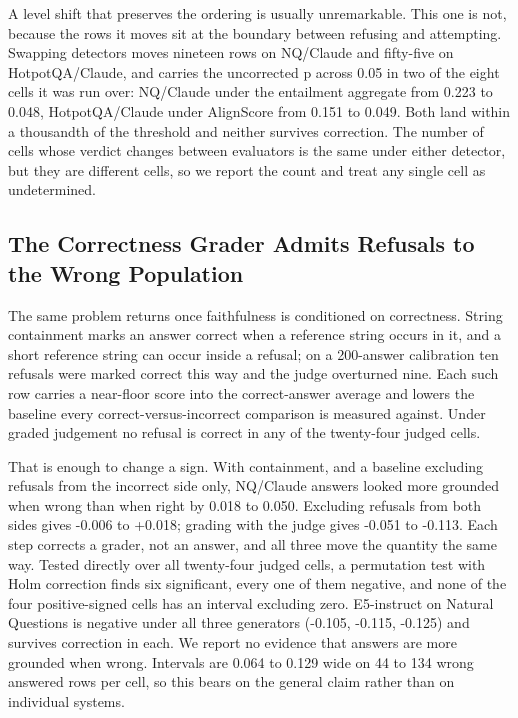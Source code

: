 \documentclass[11pt]{article}
\begin{document}
A level shift that preserves the ordering is usually unremarkable. This one is not, because the rows it moves sit at the boundary between refusing and attempting. Swapping detectors moves nineteen rows on NQ/Claude and fifty-five on HotpotQA/Claude, and carries the uncorrected p across 0.05 in two of the eight cells it was run over: NQ/Claude under the entailment aggregate from 0.223 to 0.048, HotpotQA/Claude under AlignScore from 0.151 to 0.049. Both land within a thousandth of the threshold and neither survives correction. The number of cells whose verdict changes between evaluators is the same under either detector, but they are different cells, so we report the count and treat any single cell as undetermined.


\subsection{The Correctness Grader Admits Refusals to the Wrong Population}
\label{sec:refusals}

The same problem returns once faithfulness is conditioned on correctness. String containment marks an answer correct when a reference string occurs in it, and a short reference string can occur inside a refusal; on a 200-answer calibration ten refusals were marked correct this way and the judge overturned nine. Each such row carries a near-floor score into the correct-answer average and lowers the baseline every correct-versus-incorrect comparison is measured against. Under graded judgement no refusal is correct in any of the twenty-four judged cells.

That is enough to change a sign. With containment, and a baseline excluding refusals from the incorrect side only, NQ/Claude answers looked more grounded when wrong than when right by 0.018 to 0.050. Excluding refusals from both sides gives -0.006 to +0.018; grading with the judge gives -0.051 to -0.113. Each step corrects a grader, not an answer, and all three move the quantity the same way. Tested directly over all twenty-four judged cells, a permutation test with Holm correction finds six significant, every one of them negative, and none of the four positive-signed cells has an interval excluding zero. E5-instruct on Natural Questions is negative under all three generators (-0.105, -0.115, -0.125) and survives correction in each. We report no evidence that answers are more grounded when wrong. Intervals are 0.064 to 0.129 wide on 44 to 134 wrong answered rows per cell, so this bears on the general claim rather than on individual systems.
\end{document}
